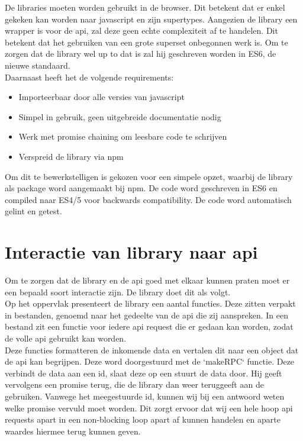 De libraries moeten worden gebruikt in de browser. Dit betekent dat er enkel gekeken kan worden naar javascript en zijn supertypes. Aangezien de library een wrapper is voor de api, zal deze geen echte complexiteit af te handelen. Dit betekent dat het gebruiken van een grote superset onbegonnen werk is. Om te zorgen dat de library wel up to dat is zal hij geschreven worden  in ES6, de nieuwe standaard. \\

Daarnaast heeft het de volgende requirements:

\begin{itemize}
	\item Importeerbaar door alle versies van javascript
	\item Simpel in gebruik, geen uitgebreide documentatie nodig
	\item Werk met promise chaining om leesbare code te schrijven
	\item Verspreid de library via npm
\end{itemize}

Om dit te bewerkstelligen is gekozen voor een simpele opzet, waarbij de library als package word aangemaakt bij npm. De code word geschreven in ES6 en compiled naar ES4/5 voor backwards compatibility. De code word automatisch gelint en getest.

\section{Interactie van library naar api}

Om te zorgen dat de library en de api goed met elkaar kunnen praten moet er een bepaald soort interactie zijn. De library doet dit als volgt. \\

Op het oppervlak presenteert de library een aantal functies. Deze zitten verpakt in bestanden, genoemd naar het gedeelte van de api die zij aanspreken. In een bestand zit een functie voor iedere api request die er gedaan kan worden, zodat de volle api gebruikt kan worden. \\ 

Deze functies formatteren de inkomende data en vertalen dit naar een object dat de api kan begrijpen. Deze word doorgestuurd met de `makeRPC` functie. Deze verbindt de data aan een id, slaat deze op een stuurt de data door. Hij geeft vervolgens een promise terug, die de library dan weer teruggeeft aan de gebruiken. Vanwege het meegestuurde id, kunnen wij bij een antwoord weten welke promise vervuld moet worden. Dit zorgt ervoor dat wij een hele hoop api requests apart in een non-blocking loop apart af kunnen handelen en aparte waardes hiermee terug kunnen geven. \\


